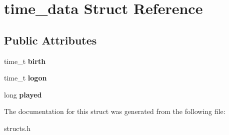 \hypertarget{structtime__data}{\section{time\-\_\-data Struct Reference}
\label{structtime__data}
}
\subsection*{Public Attributes}
\begin{DoxyCompactItemize}
\item 
\hypertarget{structtime__data_a335b9731cbcfad50a9492f732cd62d64}{time\-\_\-t {\bfseries birth}}\label{structtime__data_a335b9731cbcfad50a9492f732cd62d64}

\item 
\hypertarget{structtime__data_a74a114e6be3ccb5a8852ae8b7e19e995}{time\-\_\-t {\bfseries logon}}\label{structtime__data_a74a114e6be3ccb5a8852ae8b7e19e995}

\item 
\hypertarget{structtime__data_a8fb1c887d95048ba19a8081470ba490c}{long {\bfseries played}}\label{structtime__data_a8fb1c887d95048ba19a8081470ba490c}

\end{DoxyCompactItemize}


The documentation for this struct was generated from the following file\-:\begin{DoxyCompactItemize}
\item 
structs.\-h\end{DoxyCompactItemize}
